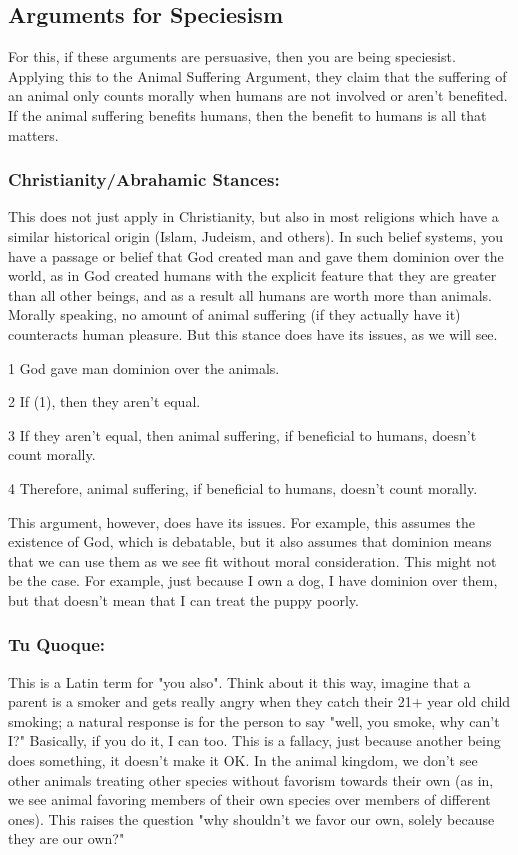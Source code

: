 \subsection{Arguments for Speciesism}

For this, if these arguments are persuasive, then you are being speciesist. Applying this to the Animal Suffering Argument, they claim that the suffering of an animal only counts morally when humans are not involved or aren't benefited. If the animal suffering benefits humans, then the benefit to humans is all that matters. 
\subsubsection{Christianity/Abrahamic Stances:}

This does not just apply in Christianity, but also in most religions which have a similar historical origin (Islam, Judeism, and others). In such belief systems, you have a passage or belief that God created man and gave them dominion over the world, as in God created humans with the explicit feature that they are greater than all other beings, and as a result all humans are worth more than animals. Morally speaking, no amount of animal suffering (if they actually have it) counteracts human pleasure. But this stance does have its issues, as we will see.
\begin{earg}
    \item[1] God gave man dominion over the animals.
    \item[2] If (1), then they aren't equal.
    \item[3] If they aren't equal, then animal suffering, if beneficial to humans, doesn't count morally.
    \item[4] Therefore, animal suffering, if beneficial to humans, doesn't count morally. 
\end{earg}
This argument, however, does have its issues. For example, this assumes the existence of God, which is debatable, but it also assumes that dominion means that we can use them as we see fit without moral consideration. This might not be the case. For example, just because I own a dog, I have dominion over them, but that doesn't mean that I can treat the puppy poorly.  
\subsubsection{Tu Quoque:}

This is a Latin term for "you also". Think about it this way, imagine that a parent is a smoker and gets really angry when they catch their 21+ year old child smoking; a natural response is for the person to say "well, you smoke, why can't I?" Basically, if you do it, I can too. This is a fallacy, just because another being does something, it doesn't make it OK. In the animal kingdom, we don't see other animals treating other species without favorism towards their own (as in, we see animal favoring members of their own species over members of different ones). This raises the question "why shouldn't we favor our own, solely because they are our own?" 

